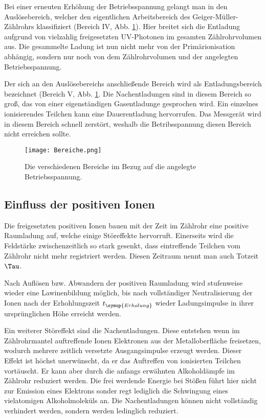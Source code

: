 Bei einer erneuten Erhöhung der Betriebsspannung gelangt man in den Auslösebereich,
welcher den eigentlichen Arbeitsbereich des Geiger-Müller-Zählrohrs klassifiziert
(Bereich IV, Abb. \ref{fig:Bereiche}).
Hier breitet sich die Entladung aufgrund von vielzahlig
freigesetzten UV-Photonen im gesamten Zählrohrvolumen aus. Die gesammelte Ladung
ist nun nicht mehr von der Primärionisation abhängig, sondern nur noch von
dem Zählrohrvolumen und der angelegten Betriebsspannung.

Der sich an den Auslösebereichs anschließende Bereich wird als Entladungsbereich
bezeichnet (Bereich V, Abb. \ref{fig:Bereiche}. Die Nachentladungen sind
in diesem Bereich so groß, das von einer eigenständigen Gasentladunge gesprochen wird.
Ein einzelnes ionisierendes Teilchen kann eine Dauerentladung hervorrufen.
Das Messgerät wird in diesem Bereich schnell zerstört, weshalb die Betribsspannung
diesen Bereich nicht erreichen sollte.

\begin{figure}
  \centering
  \texttt{[image: Bereiche.png]}
  \caption{Die verschiedenen Bereiche im Bezug auf die angelegte Betriebsspannung.}
  \label{fig:Bereiche}
\end{figure}

\newpage

\subsection{Einfluss der positiven Ionen}

Die freigesetzten positiven Ionen bauen mit der Zeit im Zählrohr eine positive
Raumladung auf, welche einige Störeffekte hervorruft. Einerseits wird die
Feldstärke zwischenzeitlich so stark gesenkt, dass eintreffende Teilchen vom
Zählrohr nicht mehr registriert werden. Diesen Zeitraum nennt man auch Totzeit $\Tau$.

Nach Auflösen bzw. Abwandern der positiven Raumladung wird stufenweise wieder eine
Lawinenbildung möglich, bis nach vollständiger Neutralisierung der Ionen nach der
Erhohlungszeit $t_{\symup{Erholung}}$ wieder Ladungsimpulse in ihrer ursprünglichen Höhe erreicht
werden.

Ein weiterer Störeffekt sind die Nachentladungen. Diese entstehen wenn im Zählrohrmantel
auftreffende Ionen Elektronen aus der Metalloberfläche freisetzen, wodurch mehrere
zeitlich versetzte Ausgangsimpulse erzeugt werden. Dieser Effekt ist höchst unerwünscht,
da er das Auftreffen von ionisierten Teilchen vortäuscht. Er kann aber durch die anfangs
erwähnten Alkoholdämpfe im Zählrohr reduziert werden. Die frei werdende Energie
bei Stößen führt hier nicht zur Emission eines Elektrons sonder regt lediglich
die Schwingung eines vielatomigen Alkoholmoleküls an. Die Nachentladungen
können nicht vollständig verhindert werden, sondern werden ledinglich reduziert.

